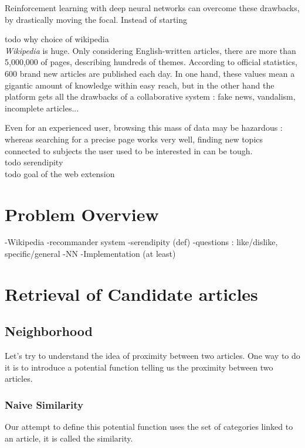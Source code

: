 \documentclass[11pt]{article}
\theoremstyle{plain}
\theoremstyle{definition}
\theoremstyle{remark}
\begin{document}
Reinforcement learning with deep neural networks can overcome these drawbacks, by drastically moving the focal. Instead of starting 

todo why choice of wikipedia\\

\textit{Wikipedia} is huge. Only considering English-written articles, there are more than 5,000,000 of pages, describing hundreds of themes. According to official statistics, 600 brand new articles are published each day. In one hand, these values mean a gigantic amount of knowledge within easy reach, but in the other hand the platform gets all the drawbacks of a collaborative system : fake news, vandalism, incomplete articles... 

Even for an experienced user, browsing this mass of data may be hazardous : whereas searching for a precise page works very well, finding new topics connected to subjects the user used to be interested in can be tough. \\

todo serendipity \\

todo goal of the web extension

\section{Problem Overview}
-Wikipedia
-recommander system
-serendipity (def)
-questions : like/dislike, specific/general
-NN
-Implementation
(at least)



\section{Retrieval of Candidate articles}

\subsection{Neighborhood}

Let's try to understand the idea of proximity between two articles. One way to do it is to introduce a potential function telling us the proximity between two articles.

\subsubsection{Naive Similarity}

Our attempt to define this potential function uses the set of categories linked to an article, it is called the similarity.
\end{document}
